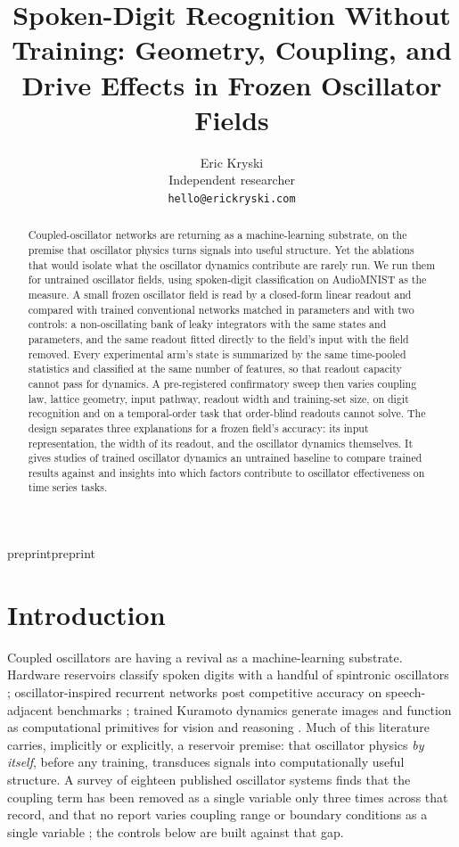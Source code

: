 \documentclass{article}
\title{Spoken-Digit Recognition Without Training: Geometry, Coupling,
and Drive Effects in Frozen Oscillator Fields}
\author{Eric Kryski \\
Independent researcher \\
\texttt{hello@erickryski.com}}
\makeatletter
\newcommand{\iclr@floatbarrier}{\par\vspace{\z@}%
  \ifx\@deferlist\@empty\else\clearpage\fi}
\let\iclr@section\section
\renewcommand{\section}{\iclr@floatbarrier\iclr@section}
\makeatother
\begin{document}
\maketitle
\def\iclrface{preprint}\def\iclrpreprint{preprint}
\ifx\iclrface\iclrpreprint\lhead{}\fi
\begin{abstract}
Coupled-oscillator networks are returning as a machine-learning
substrate, on the premise that oscillator physics turns signals into
useful structure. Yet the ablations that would isolate what the
oscillator dynamics contribute are rarely run. We run them for untrained
oscillator fields, using spoken-digit classification on AudioMNIST as
the measure. A small frozen oscillator field is read by a closed-form
linear readout and compared with trained conventional networks matched
in parameters and with two controls: a non-oscillating bank of leaky
integrators with the same states and parameters, and the same readout
fitted directly to the field's input with the field removed. Every
experimental arm's state is summarized by the same time-pooled
statistics and classified at the same number of features, so that
readout capacity cannot pass for dynamics. A pre-registered confirmatory
sweep then varies coupling law, lattice geometry, input pathway, readout
width and training-set size, on digit recognition and on a
temporal-order task that order-blind readouts cannot solve. The design
separates three explanations for a frozen field's accuracy: its input
representation, the width of its readout, and the oscillator dynamics
themselves. It gives studies of trained oscillator dynamics an untrained
baseline to compare trained results against and insights into which
factors contribute to oscillator effectiveness on time series tasks.
\end{abstract}

\section{Introduction}\label{introduction}

Coupled oscillators are having a revival as a machine-learning
substrate. Hardware reservoirs classify spoken digits with a handful of
spintronic oscillators \citep{torrejon2017}; oscillator-inspired
recurrent networks post competitive accuracy on speech-adjacent
benchmarks \citep{rusch2021}; trained Kuramoto dynamics generate images
\citep{unconv-ai2026} and function as computational primitives for
vision and reasoning \citep{miyato2025}. Much of this literature
carries, implicitly or explicitly, a reservoir premise: that oscillator
physics \emph{by itself}, before any training, transduces signals into
computationally useful structure. A survey of eighteen published
oscillator systems finds that the coupling term has been removed as a
single variable only three times across that record, and that no report
varies coupling range or boundary conditions as a single variable
\citep{kryski2026}; the controls below are built against that gap.
\end{document}
